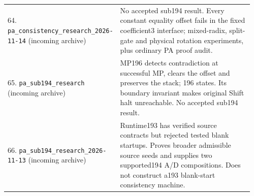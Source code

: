 \begin{longtable}{@{}p{0.35\linewidth}p{0.61\linewidth}@{}}
64. \nolinkurl{pa_consistency_research_2026-11-14} (incoming archive) & No accepted sub194 result. Every constant equality offset fails in the fixed coefficient3 interface; mixed-radix, split-gate and physical rotation experiments, plus ordinary PA proof audit.\\[5pt]
65. \nolinkurl{pa_sub194_research} (incoming archive) & MP196 detects contradiction at successful MP, clears the offset and preserves the stack; 196 states. Its boundary invariant makes original Shift halt unreachable. No accepted sub194 result.\\[5pt]
66. \nolinkurl{pa_sub194_research_2026-11-13} (incoming archive) & Runtime193 has verified source contracts but rejected tested blank startups. Proves broader admissible source seeds and supplies two supported194 A/D compositions. Does not construct a193 blank-start consistency machine.\\[5pt]
\bottomrule\end{longtable}
